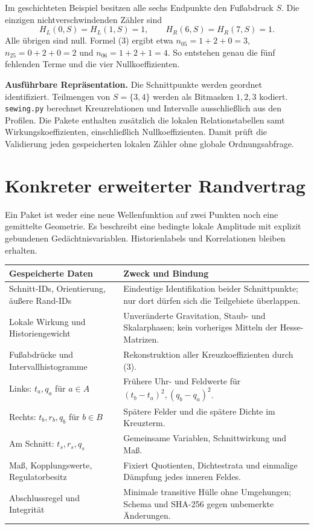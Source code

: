 \documentclass[10pt,a4paper]{article}
\begin{document}
Im geschichteten Beispiel besitzen alle sechs Endpunkte den Fußabdruck
$S$. Die einzigen nichtverschwindenden Zähler sind
\[
 H_L(0,S)=H_L(1,S)=1,\qquad H_R(6,S)=H_R(7,S)=1.
\]
Alle übrigen sind null. Formel (3) ergibt etwa
$n_{05}=1+2+0=3$, $n_{25}=0+2+0=2$ und $n_{06}=1+2+1=4$.
So entstehen genau die fünf fehlenden Terme und die vier Nullkoeffizienten.

\textbf{Ausführbare Repräsentation.}
Die Schnittpunkte werden geordnet identifiziert. Teilmengen von $S=\{3,4\}$
werden als Bitmasken $1,2,3$ kodiert. \texttt{sewing.py} berechnet
Kreuzrelationen und Intervalle ausschließlich aus den Profilen.
Die Pakete enthalten zusätzlich die lokalen Relationstabellen samt
Wirkungskoeffizienten, einschließlich Nullkoeffizienten. Damit prüft die
Validierung jeden gespeicherten lokalen Zähler ohne globale Ordnungsabfrage.
\newpage

\section{Konkreter erweiterter Randvertrag}
Ein Paket ist weder eine neue Wellenfunktion auf zwei Punkten noch eine
gemittelte Geometrie. Es beschreibt eine bedingte lokale Amplitude mit explizit
gebundenen Gedächtnisvariablen. Historienlabels und Korrelationen bleiben erhalten.

\begin{center}\begin{tabular}{p{.29\linewidth}p{.62\linewidth}}\toprule
Gespeicherte Daten & Zweck und Bindung\\\midrule
Schnitt-IDs, Orientierung, äußere Rand-IDs & Eindeutige Identifikation beider Schnittpunkte; nur dort dürfen sich die Teilgebiete überlappen.\\
Lokale Wirkung und Historiengewicht & Unveränderte Gravitation, Staub- und Skalarphasen; kein vorheriges Mitteln der Hesse-Matrizen.\\
Fußabdrücke und Intervallhistogramme & Rekonstruktion aller Kreuzkoeffizienten durch (3).\\
Links: $t_a,q_a$ für $a\in A$ & Frühere Uhr- und Feldwerte für $(t_b-t_a)^2,(q_b-q_a)^2$.\\
Rechts: $t_b,r_b,q_b$ für $b\in B$ & Spätere Felder und die spätere Dichte im Kreuzterm.\\
Am Schnitt: $t_s,r_s,q_s$ & Gemeinsame Variablen, Schnittwirkung und Maß.\\
Maß, Kopplungswerte, Regulatorbesitz & Fixiert Quotienten, Dichtestrata und einmalige Dämpfung jedes inneren Feldes.\\
Abschlussregel und Integrität & Minimale transitive Hülle ohne Umgehungen; Schema und SHA-256 gegen unbemerkte Änderungen.\\\bottomrule
\end{tabular}\end{center}
\end{document}
